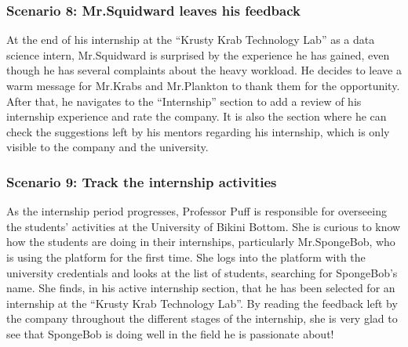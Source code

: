 \subsubsection{Scenario 8: Mr.Squidward leaves his feedback}\label{subsubsec:scenario_8}
At the end of his internship at the ``Krusty Krab Technology Lab'' as a data science intern, Mr.Squidward is surprised by the experience 
he has gained, even though he has several complaints about the heavy workload. He decides to leave a warm message for Mr.Krabs and Mr.Plankton 
to thank them for the opportunity. After that, he navigates to the ``Internship'' section to add a review of his internship experience and rate 
the company. It is also the section where he can check the suggestions left by his mentors regarding his internship, which is only visible to the 
company and the university.

\subsubsection{Scenario 9: Track the internship activities}\label{subsubsec:scenario_9}
As the internship period progresses, Professor Puff is responsible for overseeing the students' activities at the University of Bikini Bottom. 
She is curious to know how the students are doing in their internships, particularly Mr.SpongeBob, who is using the platform for the first time. 
She logs into the platform with the university credentials and looks at the list of students, searching for SpongeBob's name. She finds, 
in his active internship section, that he has been selected for an internship at the ``Krusty Krab Technology Lab''. By reading the feedback 
left by the company throughout the different stages of the internship, she is very glad to see that SpongeBob is doing well in the field he is 
passionate about!


